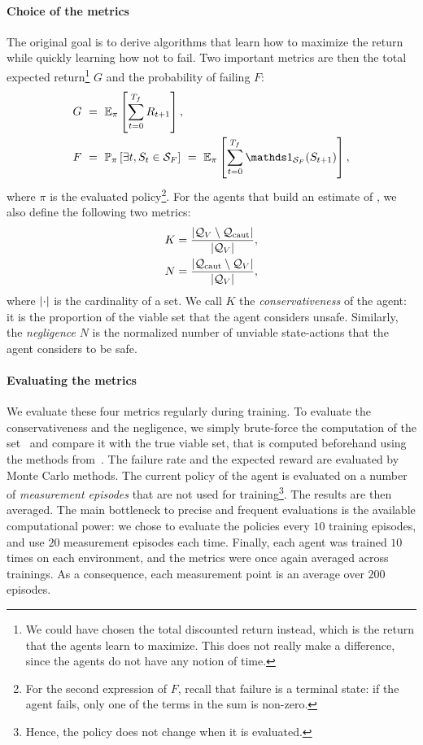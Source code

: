 \paragraph{Choice of the metrics} The original goal is to derive algorithms that learn how to maximize the return while quickly learning how not to fail. Two important metrics are then the total expected return\footnote{We could have chosen the total discounted return instead, which is the return that the agents learn to maximize. This does not really make a difference, since the agents do not have any notion of time.} $G$ and the probability of failing $F$:
\begin{align}
	G~&=~\expected_\pi\left[\sum_{t=0}^\Tf R_{t+1}\right],\\
	F~&=~\P_\pi\left[\exists t, S_t\in\SF\right]~=~\expected_\pi\left[\sum_{t=0}^\Tf \indicator_\SF(S_{t+1})\right],
\end{align}
where $\pi$ is the evaluated policy\footnote{For the second expression of $F$, recall that failure is a terminal state: if the agent fails, only one of the terms in the sum is non-zero.}. For the agents that build an estimate of \QV, we also define the following two metrics:
\begin{align}
	K = \frac{{\left|\mathcal{Q}_{V}\setminus\mathcal{Q}_\text{caut}\right|}}{{\left|\mathcal{Q}_{V}\right|}},\\
	N = \frac{{\left|\mathcal{Q}_\text{caut}\setminus\mathcal{Q}_{V}\right|}}{{\left|\mathcal{Q}_{V}\right|}},
\end{align} 
where ${\left|\cdot\right|}$ is the cardinality of a set. We call $K$ the\emph{ conservativeness} of the agent: it is the proportion of the viable set that the agent considers unsafe. Similarly, the\emph{ negligence} $N$ is the normalized number of unviable state-actions that the agent considers to be safe.

\paragraph{Evaluating the metrics} We evaluate these four metrics regularly during training. To evaluate the conservativeness and the negligence, we simply brute-force the computation of the set \Qcaut~and compare it with the true viable set, that is computed beforehand using the methods from~\cite{heim2019beyond}. The failure rate and the expected reward are evaluated by Monte Carlo methods. The current policy of the agent is evaluated on a number of\emph{ measurement episodes} that are not used for training\footnote{Hence, the policy does not change when it is evaluated.}. The results are then averaged. The main bottleneck to precise and frequent evaluations is the available computational power: we chose to evaluate the policies every $10$ training episodes, and use $20$ measurement episodes each time. Finally, each agent was trained $10$ times on each environment, and the metrics were once again averaged across trainings. As a consequence, each measurement point is an average over $200$ episodes.

